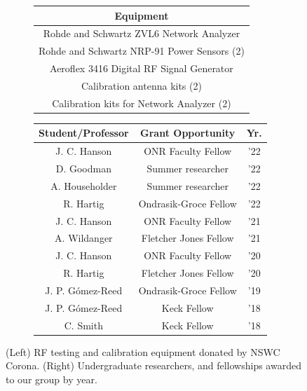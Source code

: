 \documentclass[11pt]{amsart}
\begin{document}
\begin{figure}[hb]
\footnotesize
\centering
\begin{subfigure}{0.45\textwidth}
\centering
\begin{tabular}{c}
Equipment\\ \hline
Rohde and Schwartz ZVL6 Network Analyzer \\
Rohde and Schwartz NRP-91 Power Sensors (2) \\
Aeroflex 3416 Digital RF Signal Generator \\
Calibration antenna kits (2) \\
Calibration kits for Network Analyzer (2)
\end{tabular}
\end{subfigure}
\hspace{0.5cm}
\begin{subfigure}{0.45\textwidth}
\centering
\begin{tabular}{c c c}
Student/Professor & Grant Opportunity & Yr. \\ \hline
J. C. Hanson & ONR Faculty Fellow & '22 \\
D. Goodman & Summer researcher & '22 \\
A. Householder & Summer researcher & '22 \\
R. Hartig & Ondrasik-Groce Fellow & '22 \\
J. C. Hanson & ONR Faculty Fellow & '21 \\
A. Wildanger & Fletcher Jones Fellow & '21 \\
J. C. Hanson & ONR Faculty Fellow & '20 \\
R. Hartig & Fletcher Jones Fellow & '20 \\
J. P. G\'{o}mez-Reed & Ondrasik-Groce Fellow & '19 \\
J. P. G\'{o}mez-Reed & Keck Fellow & '18 \\
C. Smith & Keck Fellow & '18
\end{tabular}
\end{subfigure}
\caption{\label{tab:fac} (Left) RF testing and calibration equipment donated by NSWC Corona. (Right) Undergraduate researchers, and fellowships awarded to our group by year.}
\end{figure}
\end{document}
